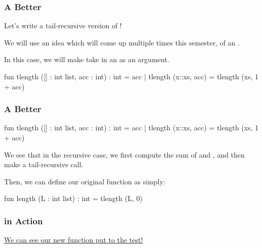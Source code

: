 \documentclass[aspectratio=169, handout]{beamer}
\begin{document}
\begin{frame}[fragile]
  \frametitle{A Better }

  Let's write a tail-recursive version of !

  \pause
  \vspace{\fill}

  We will use an idea which will come up multiple times this semester, of an .

  \pause
  \vspace{\fill}


  \pause
  \vspace{\fill}

  In this case, we will make  take in an  as an argument.

  \pause
  \vspace{\fill}

  \begin{codeblock}
    fun tlength ([] : int list, acc : int) : int = acc
      | tlength (x::xs, acc) = tlength (xs, 1 + acc)
  \end{codeblock}
\end{frame}

\begin{frame}[fragile]
  \frametitle{A Better }

  \begin{codeblock}
    fun tlength ([] : int list, acc : int) : int = acc
      | tlength (x::xs, acc) = tlength (xs, 1 + acc)
  \end{codeblock}

  \pause
  \vspace{\fill}

  We see that in the recursive case, we first compute the sum of  and ,
  and then make a tail-recursive call.

  \pause
  \vspace{\fill}

  Then, we can define our original  function as simply:
  \begin{codeblock}
    fun length (L : int list) : int = tlength (L, 0)
  \end{codeblock}
\end{frame}

\begin{frame}[fragile]
  \frametitle{ in Action}

  \color{blue} \href{https://asciinema.org/a/587210}{We can see our new  function put to the test!}

\end{frame}
\end{document}
